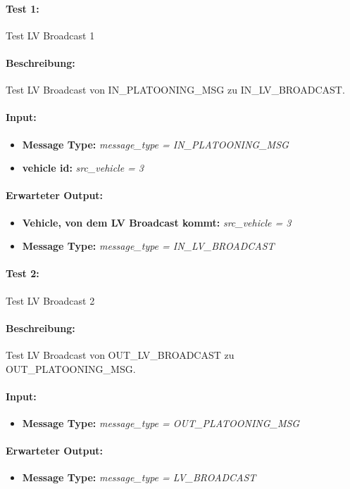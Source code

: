 \documentclass[a4paper, 12pt, titlepage]{scrartcl}
\begin{document}
			\paragraph{Test 1:}{Test LV Broadcast 1
			\paragraph{Beschreibung:} Test LV Broadcast von IN\_PLATOONING\_MSG zu IN\_LV\_BROADCAST.
			\paragraph{Input:}
			\begin{itemize} \itemsep-0.5em
				\item \textbf{Message Type:} \emph{message\_type = IN\_PLATOONING\_MSG}
				\item \textbf{vehicle id:} \emph{src\_vehicle = 3}
			\end{itemize}
			\paragraph{Erwarteter Output:}
			\begin{itemize} \itemsep-0.5em
				\item \textbf{Vehicle, von dem LV Broadcast kommt:} \emph{src\_vehicle = 3}
				\item \textbf{Message Type:} \emph{message\_type = IN\_LV\_BROADCAST}
			\end{itemize}

			\paragraph{Test 2:}{Test LV Broadcast 2}
			\paragraph{Beschreibung:} Test LV Broadcast von OUT\_LV\_BROADCAST zu OUT\_PLATOONING\_MSG.
			\paragraph{Input:}
			\begin{itemize} \itemsep-0.5em
				\item \textbf{Message Type:} \emph{message\_type = OUT\_PLATOONING\_MSG}
			\end{itemize}
			\paragraph{Erwarteter Output:}
			\begin{itemize} \itemsep-0.5em
				\item \textbf{Message Type:} \emph{message\_type = LV\_BROADCAST}
			\end{itemize}				

}
\end{document}

